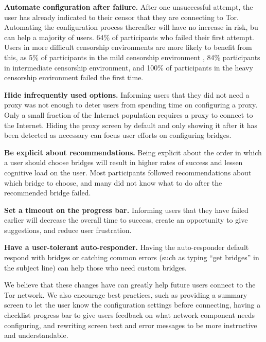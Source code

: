 \documentclass[USenglish,oneside,twocolumn]{article}
\begin{document}
\begin{description}
\item {\bfseries Automate configuration after failure.} After one unsuccessful attempt, the user has already indicated to their censor that they are connecting to Tor. Automating the configuration process thereafter will have no increase in risk, bu can help a majority of users. 64\% of participants who failed their first attempt. Users in more difficult censorship environments are more likely to benefit from this, as 5\% of participants in the mild censorship environment , 84\% participants in intermediate censorship environment, and 100\% of participants in the heavy censorship environment failed the first time.
\item{\bfseries Hide infrequently used options.} Informing users that they did not need a proxy was not enough to deter users from spending time on configuring a proxy. Only a small fraction of the Internet population requires a proxy to connect to the Internet. Hiding the proxy screen by default and only showing it after it has been detected as necessary can focus user efforts on configuring bridges.
\item {\bfseries Be explicit about recommendations.} Being explicit about the order in which a user should choose bridges will result in higher rates of success and lessen cognitive load on the user. Most participants followed recommendations about which bridge to choose, and many did not know what to do after the recommended bridge failed. 
\item{\bfseries Set a timeout on the progress bar.} Informing users that they have failed earlier will decrease the overall time to success, create an opportunity to give suggestions, and reduce user frustration. 
\item{\bfseries Have a user-tolerant auto-responder.} Having the auto-responder default respond with bridges or catching common errors (such as typing ``get bridges'' in the subject line) can help those who need custom bridges. 
\end{description} 

We believe that these changes have can greatly help future users connect to the Tor network. We also encourage best practices, such as providing a summary screen to let the user know the configuration settings before connecting, having a checklist progress bar to give users feedback on what network component needs configuring, and rewriting screen text and error messages to be more instructive and understandable. 
\end{document}

